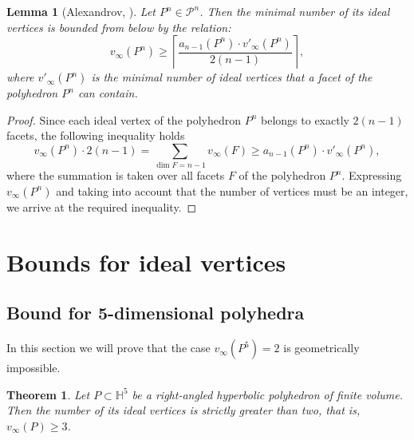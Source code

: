 \documentclass[12pt]{amsart}
\newtheorem{theorem}{Theorem}[section]
\newtheorem{lemma}{Lemma}[section]
\theoremstyle{definition}
\begin{document}
	\begin{lemma}[Alexandrov, \cite{Ale23}] \label{lem:alex_recurrence}
		Let $P^n \in \mathcal{P}^n$. Then the minimal number of its ideal vertices is bounded from below by the relation:
		$$
		v_\infty(P^n) \ge \left\lceil \frac{a_{n-1}(P^n) \cdot v'_\infty(P^n)}{2(n-1)} \right\rceil,
		$$
		where $v'_\infty(P^n)$ is the minimal number of ideal vertices that a facet of the polyhedron $P^n$ can contain.
	\end{lemma}
	\begin{proof}
		Since each ideal vertex of the polyhedron $P^n$ belongs to exactly $2(n-1)$ facets, the following inequality holds
		$$
		v_\infty(P^n) \cdot 2(n-1) = \sum_{\dim F = n-1} v_\infty(F) \ge a_{n-1}(P^n) \cdot v'_\infty(P^n),
		$$
		where the summation is taken over all facets $F$ of the polyhedron $P^n$. Expressing $v_\infty(P^n)$ and taking into account that the number of vertices must be an integer, we arrive at the required inequality.
	\end{proof}
	
	\section{Bounds for ideal vertices}
	
	\subsection{Bound for 5-dimensional polyhedra}
	
	In this section we will prove that the case $v_\infty(P^5) = 2$ is geometrically impossible.
	
	\begin{theorem} \label{thm:dim5}
		Let $P \subset \mathbb{H}^5$ be a right-angled hyperbolic polyhedron of finite volume. Then the number of its ideal vertices is strictly greater than two, that is, $v_\infty(P) \ge 3$.
	\end{theorem}
	
\end{document}

